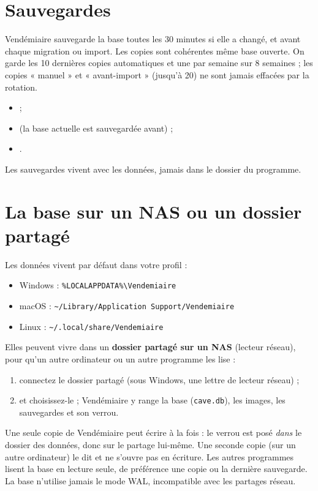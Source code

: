 \documentclass[11pt,a4paper]{article}
\begin{document}

\section{Sauvegardes}
Vendémiaire sauvegarde la base toutes les 30 minutes si elle a changé, et avant chaque migration ou import.
Les copies sont cohérentes même base ouverte. On garde les 10 dernières copies automatiques et une par
semaine sur 8 semaines ; les copies « manuel » et « avant-import » (jusqu'à 20) ne sont jamais effacées
par la rotation.
\begin{itemize}
  \item {} ;
  \item {} (la base actuelle est sauvegardée avant) ;
  \item {}.
\end{itemize}
Les sauvegardes vivent avec les données, jamais dans le dossier du programme.

\section{La base sur un NAS ou un dossier partagé}
Les données vivent par défaut dans votre profil :
\begin{itemize}
  \item Windows : \texttt{\%LOCALAPPDATA\%\textbackslash Vendemiaire}
  \item macOS : \texttt{\textasciitilde/Library/Application Support/Vendemiaire}
  \item Linux : \texttt{\textasciitilde/.local/share/Vendemiaire}
\end{itemize}
Elles peuvent vivre dans un \textbf{dossier partagé sur un NAS} (lecteur réseau), pour qu'un autre
ordinateur ou un autre programme les lise :
\begin{enumerate}
  \item connectez le dossier partagé (sous Windows, une lettre de lecteur réseau) ;
  \item {} et choisissez-le ; Vendémiaire y range la base
        (\texttt{cave.db}), les images, les sauvegardes et son verrou.
\end{enumerate}
\begin{attention}
Une seule copie de Vendémiaire peut écrire à la fois : le verrou est posé \emph{dans} le dossier des
données, donc sur le partage lui-même. Une seconde copie (sur un autre ordinateur) le dit et ne s'ouvre pas
en écriture. Les autres programmes lisent la base en lecture seule, de préférence une copie ou la dernière
sauvegarde. La base n'utilise jamais le mode WAL, incompatible avec les partages réseau.
\end{attention}
\end{document}
